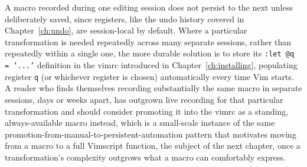 A macro recorded during one editing session does not persist to the next unless deliberately saved, since registers, like the undo history covered in Chapter~\ref{ch:undo}, are session-local by default. Where a particular transformation is needed repeatedly across many separate sessions, rather than repeatedly within a single one, the more durable solution is to store its \texttt{:let @q = '...'} definition in the vimrc introduced in Chapter~\ref{ch:installing}, populating register \texttt{q} (or whichever register is chosen) automatically every time Vim starts. A reader who finds themselves recording substantially the same macro in separate sessions, days or weeks apart, has outgrown live recording for that particular transformation and should consider promoting it into the vimrc as a standing, always-available macro instead, which is a small-scale instance of the same promotion-from-manual-to-persistent-automation pattern that motivates moving from a macro to a full Vimscript function, the subject of the next chapter, once a transformation's complexity outgrows what a macro can comfortably express.

